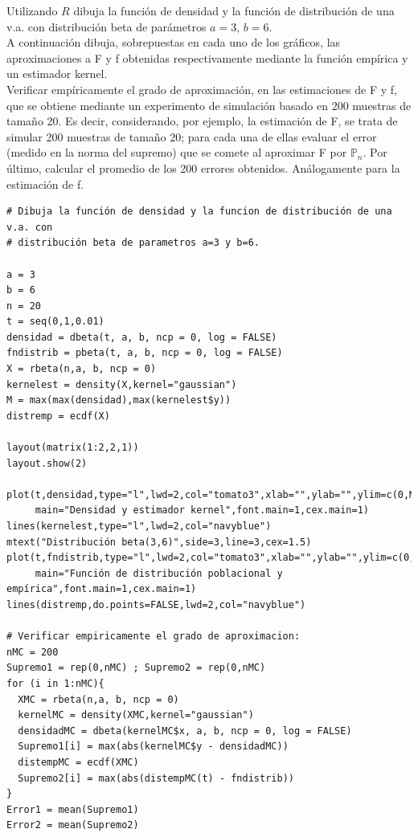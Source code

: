 \begin{problem}[3]
Utilizando $R$ dibuja la función de densidad y la función de distribución de una v.a. con distribución beta de parámetros $a = 3$, $b = 6$.\\
A continuación dibuja, sobrepuestas en cada uno de los gráficos, las aproximaciones a F y f obtenidas respectivamente mediante la función empírica y un estimador kernel.\\
Verificar empíricamente el grado de aproximación, en las estimaciones de F y f, que se obtiene mediante un experimento de simulación basado en 200 muestras de tamaño 20. Es decir, considerando, por ejemplo, la estimación de F, se trata de simular 200 muestras de tamaño 20; para cada una de ellas evaluar el error (medido en la norma del supremo) que se comete al aproximar F por $\mathbb{P}_n$. Por último, calcular el promedio de los 200 errores obtenidos. Análogamente para la estimación de f.

\solution
\begin{verbatim}
# Dibuja la función de densidad y la funcion de distribución de una v.a. con 
# distribución beta de parametros a=3 y b=6.

a = 3
b = 6
n = 20
t = seq(0,1,0.01)
densidad = dbeta(t, a, b, ncp = 0, log = FALSE)
fndistrib = pbeta(t, a, b, ncp = 0, log = FALSE)
X = rbeta(n,a, b, ncp = 0)
kernelest = density(X,kernel="gaussian")
M = max(max(densidad),max(kernelest$y))
distremp = ecdf(X)

layout(matrix(1:2,2,1))
layout.show(2)

plot(t,densidad,type="l",lwd=2,col="tomato3",xlab="",ylab="",ylim=c(0,M),
     main="Densidad y estimador kernel",font.main=1,cex.main=1)
lines(kernelest,type="l",lwd=2,col="navyblue")
mtext("Distribución beta(3,6)",side=3,line=3,cex=1.5)
plot(t,fndistrib,type="l",lwd=2,col="tomato3",xlab="",ylab="",ylim=c(0,1),
     main="Función de distribución poblacional y empírica",font.main=1,cex.main=1)
lines(distremp,do.points=FALSE,lwd=2,col="navyblue")

# Verificar empiricamente el grado de aproximacion:
nMC = 200
Supremo1 = rep(0,nMC) ; Supremo2 = rep(0,nMC)
for (i in 1:nMC){
  XMC = rbeta(n,a, b, ncp = 0)
  kernelMC = density(XMC,kernel="gaussian")
  densidadMC = dbeta(kernelMC$x, a, b, ncp = 0, log = FALSE)
  Supremo1[i] = max(abs(kernelMC$y - densidadMC))
  distempMC = ecdf(XMC)
  Supremo2[i] = max(abs(distempMC(t) - fndistrib))
}
Error1 = mean(Supremo1)
Error2 = mean(Supremo2)
\end{verbatim}
\end{problem}


